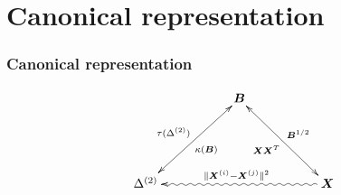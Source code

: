 \documentclass[professionalfonts, hyperref={pdfpagelabels=false,
  colorlinks=true, linkcolor=purple}]{beamer}
\begin{document}
\section{Canonical representation}
\begin{frame}[label=canonical_representation]
  \frametitle{Canonical representation}
  \begin{exampleblock}{}
    \begin{equation*}
      \xymatrix{
        & & \bm{B} \ar@{<->}[ddll]^{\kappa(\bm{B})}_{\tau(\Delta^{(2)})}
        \ar@{<->}[ddrr]^{\bm{B}^{1/2}}_{\bm{X}\bm{X}^{T}} & &\\ 
        \\
        \Delta^{(2)} \ar@{<~}[rrrr]^{\|\bm{X}^{(i)} -
          \bm{X}^{(j)}\|^{2}} & & & & \bm{X} 
      }
    \end{equation*}
  \end{exampleblock}
\end{frame}
\end{document}
